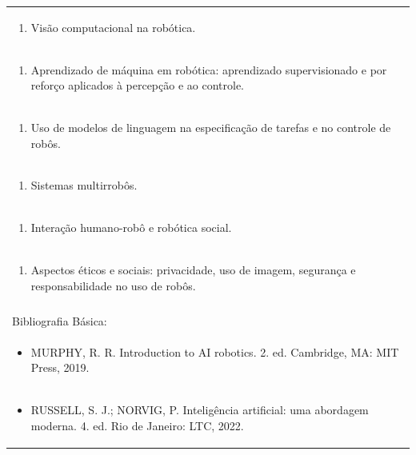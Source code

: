 \documentclass[11pt]{article}
\begin{document}
\begin{center}
\begin{longtable}{|p{4cm}|p{4cm}|p{4cm}|p{4cm}|}
\multicolumn{4}{|p{\dimexpr 16cm + 6\tabcolsep\relax}|}{\begin{enumerate}[start=2]\item Visão computacional na robótica.\end{enumerate}}\\
\multicolumn{4}{|p{\dimexpr 16cm + 6\tabcolsep\relax}|}{\begin{enumerate}[start=3]\item Aprendizado de máquina em robótica: aprendizado supervisionado e por reforço aplicados à percepção e ao controle.\end{enumerate}}\\
\multicolumn{4}{|p{\dimexpr 16cm + 6\tabcolsep\relax}|}{\begin{enumerate}[start=4]\item Uso de modelos de linguagem na especificação de tarefas e no controle de robôs.\end{enumerate}}\\
\multicolumn{4}{|p{\dimexpr 16cm + 6\tabcolsep\relax}|}{\begin{enumerate}[start=5]\item Sistemas multirrobôs.\end{enumerate}}\\
\multicolumn{4}{|p{\dimexpr 16cm + 6\tabcolsep\relax}|}{\begin{enumerate}[start=6]\item Interação humano-robô e robótica social.\end{enumerate}}\\
\multicolumn{4}{|p{\dimexpr 16cm + 6\tabcolsep\relax}|}{\begin{enumerate}[start=7]\item Aspectos éticos e sociais: privacidade, uso de imagem, segurança e responsabilidade no uso de robôs.\end{enumerate}}\\
\multicolumn{4}{|p{\dimexpr 16cm + 6\tabcolsep\relax}|}{}\\
\hline
\multicolumn{4}{|p{16cm}|}{Bibliografia Básica:}\\*
\multicolumn{4}{|p{\dimexpr 16cm + 6\tabcolsep\relax}|}{\begin{itemize}\item MURPHY, R. R. Introduction to AI robotics. 2. ed. Cambridge, MA: MIT Press, 2019.\end{itemize}}\\
\multicolumn{4}{|p{\dimexpr 16cm + 6\tabcolsep\relax}|}{\begin{itemize}\item RUSSELL, S. J.; NORVIG, P. Inteligência artificial: uma abordagem moderna. 4. ed. Rio de Janeiro: LTC, 2022.\end{itemize}}\\

\end{longtable}
\end{center}
\end{document}
